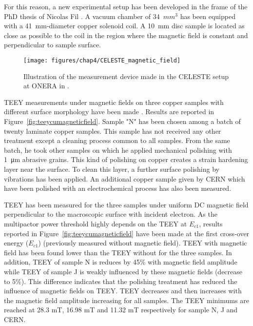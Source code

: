 For this reason, a new experimental setup has been developed in the frame of the PhD thesis of Nicolas Fil . A vacuum chamber of 34~$\si{mm^3}$ has been equipped with a 41~\si{mm}-diameter copper solenoid coil. A 10~\si{mm} disc sample is located as close as possible to the coil in the region where the magnetic field is constant and perpendicular to sample surface. 


\begin{figure}[h]
	\centering
	\texttt{[image: figures/chap4/CELESTE\_magnetic\_field]}
	\caption{Illustration of the measurement device made in the CELESTE setup at ONERA in .}
	\label{fig:celestemagneticfield}
\end{figure}

TEEY measurements under magnetic fields on three copper samples with different surface morphology have been made . Results are reported in Figure~\ref{fig:teeycumagneticfield}. Sample 
"N" has been chosen among a batch of twenty laminate copper samples. This sample has not received
any other treatment except a cleaning process common to all samples. From the same batch, he took other samples on which he applied mechanical polishing with 1~\si{\micro m} abrasive grains. This kind of polishing on copper creates a strain hardening layer near the surface. To clean this layer, a further surface polishing by vibrations has been applied. An additional copper sample given by CERN which have been polished with an electrochemical process has also been measured. 

TEEY has been measured for the three samples under uniform DC magnetic field perpendicular to the macroscopic surface with incident electron. As the multipactor power threshold highly depends on the TEEY at $E_{c1}$, results reported in Figure~\ref{fig:teeycumagneticfield} have been made at the first cross-over energy ($E_{c1}$) (previously measured without magnetic field). TEEY with magnetic field has been found lower than the TEEY without for the three samples. In addition, TEEY of sample N is reduces by 45\% with magnetic field amplitude while TEEY of sample J is weakly influenced by these magnetic fields (decrease to 5\%). This difference indicates that the polishing treatment has reduced the influence of magnetic fields on TEEY. TEEY decreases and then increases with the magnetic field amplitude increasing for all samples. The TEEY minimums are reached at 28.3 mT, 16.98 mT and 11.32 mT respectively for sample N, J and CERN. 

